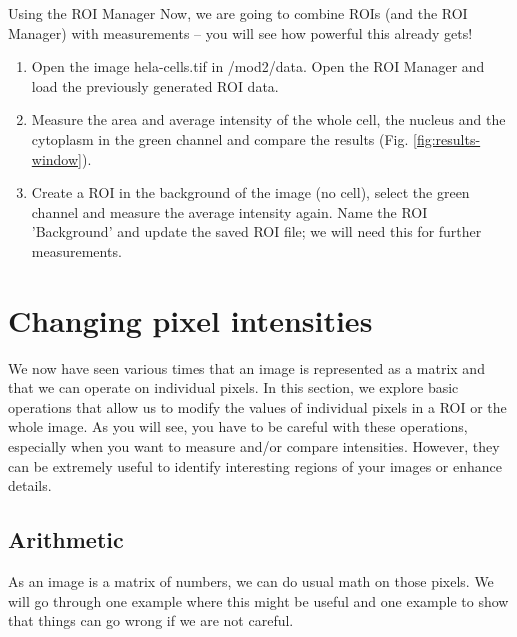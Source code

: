 \begin{taskbox}{Using the ROI Manager}
Now, we are going to combine ROIs (and the ROI Manager) with measurements -- you will see how powerful this already gets!
\begin{enumerate}
	\item Open the image hela-cells.tif in /mod2/data. Open the ROI Manager and load the previously generated ROI data.
	\item Measure the area and average intensity of the whole cell, the nucleus and the cytoplasm in the green channel and compare the results (Fig. \ref{fig:results-window}).
	
		\begin{minipage}[t]{\linewidth}
		\begin{center}
		\medskip
		\label{fig:results-window}
		\end{center}
	\end{minipage}
	
	\item Create a ROI in the background of the image (no cell), select the green channel and measure the average intensity again. Name the ROI 'Background' and update the saved ROI file; we will need this for further measurements.
\end{enumerate}	
\end{taskbox}

\section{Changing pixel intensities}
We now have seen various times that an image is represented as a matrix and that we can operate on individual pixels. In this section, we explore basic operations that allow us to modify the values of individual pixels in a ROI or the whole image. As you will see, you have to be careful with these operations, especially when you want to measure and/or compare intensities. However, they can be extremely useful to identify interesting regions of your images or enhance details.

\subsection{Arithmetic}
As an image is a matrix of numbers, we can do usual math on those pixels. We will go through one example where this might be useful and one example to show that things can go wrong if we are not careful.

